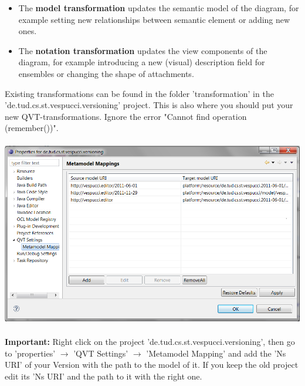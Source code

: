 \documentclass[12pt,a4paper,oneside]{report}
\begin{document}
\begin{itemize}
\item The \textbf{model transformation} updates the semantic model of the diagram, for example setting new relationships between semantic element or adding new ones.
\item The \textbf{notation transformation} updates the view components of the diagram, for example introducing a new (visual) description field for ensembles or changing the shape of attachments.\\ 
\end{itemize}
Existing transformations can be found in the folder 'transformation' in the 'de.tud.cs.st.vespucci.versioning' project. This is also where you should put your new QVT-transformations. Ignore the error "Cannot find operation (remember())".\\ \\
\includegraphics[width=15cm]{MetamodelMappings.png}\\ \\
\textbf{Important:} Right click on the project 'de.tud.cs.st.vespucci.versioning', then go to 'properties' $\rightarrow$ 'QVT Settings' $\rightarrow$ 'Metamodel Mapping' and add the 'Ns URI' of your Version with the path to the model of it. If you keep the old project edit its 'Ns URI' and the path to it with the right one.
\end{document}
